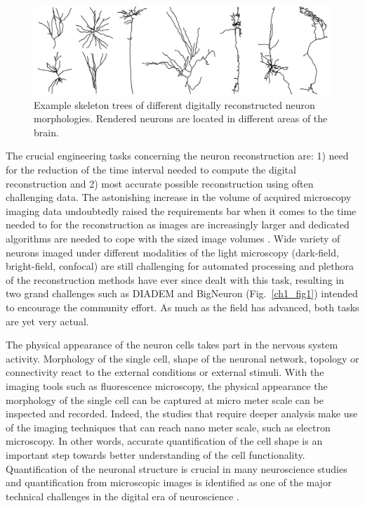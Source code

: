 \begin{figure}
	\begin{center}
		\includegraphics[width=\textwidth]{ch1_fig7}
	\end{center}
	\caption{Example skeleton trees of different digitally reconstructed neuron morphologies. Rendered neurons are located in different areas of the brain.}
	\label{ch1_fig7}
\end{figure}

The crucial engineering tasks concerning the neuron reconstruction are: 1) need for the reduction of the time interval needed to compute the digital reconstruction and 2) most accurate possible reconstruction using often challenging data. The astonishing increase in the volume of acquired microscopy imaging data \cite{meijering2016imagining} undoubtedly raised the requirements bar when it comes to the time needed to for the reconstruction as images are increasingly larger and dedicated algorithms are needed to cope with the sized image volumes \cite{peng2017automatic}. Wide variety of neurons imaged under different modalities of the light microscopy (dark-field, bright-field, confocal) are still challenging for automated processing \cite{svoboda2011past,peng2011proof} and plethora of the reconstruction methods \cite{peng2011automatic} have ever since dealt with this task, resulting in two grand challenges such as DIADEM and BigNeuron \cite{peng2015diadem,peng2015bigneuron,gillette2011diademchallenge} (Fig.~\ref{ch1_fig1}) intended to encourage the community effort. As much as the field has advanced, both tasks are yet very actual.

The physical appearance of the neuron cells takes part in the nervous system activity. Morphology of the single cell, shape of the neuronal network, topology or connectivity react to the external conditions or external stimuli. With the imaging tools such as fluorescence microscopy, the physical appearance the morphology of the single cell can be captured at micro meter scale can be inspected and recorded. Indeed, the studies that require deeper analysis make use of the imaging techniques that can reach nano meter scale, such as electron microscopy. In other words, accurate quantification of the cell shape is an important step towards better understanding of the cell functionality. Quantification of the neuronal structure is crucial in many neuroscience studies \cite{halavi2012digital} and quantification from microscopic images is identified as one of the major technical challenges in the digital era of neuroscience \cite{peng2015diadem}.

